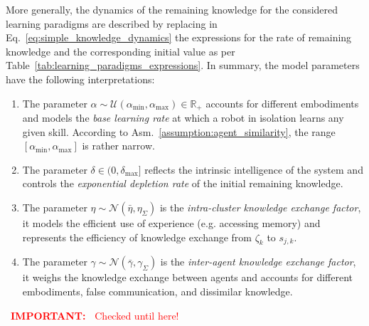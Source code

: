 \documentclass[12pt]{article}
\renewcommand{\emph}[1]{\textit{#1}}
\newcommand*{\important}[1]{\textcolor{red}{\danger~\textbf{IMPORTANT:~}} \textcolor{red}{#1}}
\begin{document}
More generally, the dynamics of the remaining knowledge for the considered learning paradigms are described by replacing in Eq.~\eqref{eq:simple_knowledge_dynamics} the expressions for the rate of remaining knowledge and the corresponding initial value as per Table~\ref{tab:learning_paradigms_expressions}. In summary, the model parameters have the following interpretations:
\begin{enumerate}
	\item The parameter $\alpha \sim \mathcal{U}(\alpha_{\text{min}},\alpha_{\text{max}}) \in \mathbb{R}_+$ accounts for different embodiments and models the \emph{base learning rate} at which a robot in isolation learns any given skill. According to Asm.~\ref{assumption:agent_similarity}, the range $[\alpha_{\text{min}},\alpha_{\text{max}}]$ is rather narrow.
	\item The parameter $\delta \in (0,\delta_{\text{max}}]$ reflects the intrinsic intelligence of the system and controls the \emph{exponential depletion rate}  of the initial remaining knowledge.
	\item The parameter $\eta \sim \mathcal{N}(\bar{\eta},\eta_{\Sigma})$ is the \emph{intra-cluster knowledge exchange factor}, it models the efficient use of experience (e.g. accessing memory) and represents the efficiency of knowledge exchange from $\zeta_k$ to $s_{j,k}$.
	\item The parameter $\gamma \sim \mathcal{N}(\bar{\gamma},\gamma_\Sigma)$ is the \emph{inter-agent knowledge exchange factor}, it weighs the knowledge exchange between agents and accounts for different embodiments, false communication, and dissimilar knowledge.
\end{enumerate}


\important{Checked until here!}
\end{document}

